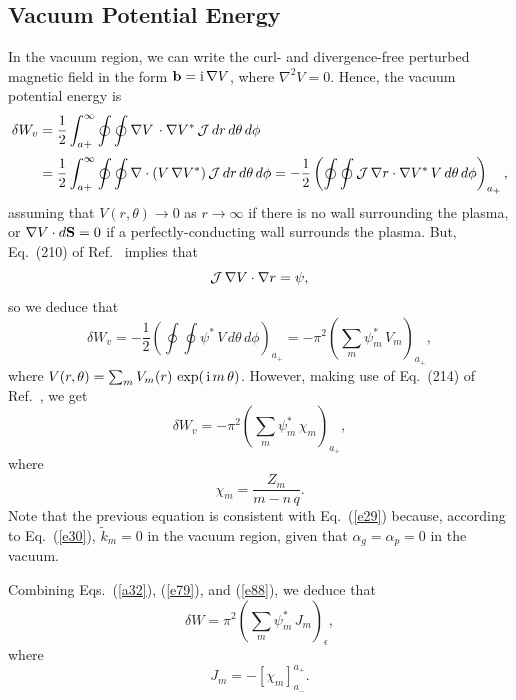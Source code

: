 \documentclass[12pt,prb,aps]{revtex4-1}
\begin{document}
\subsection{Vacuum Potential Energy}\label{vac}
In the vacuum region, we can write the curl- and divergence-free perturbed magnetic field in the form 
${\bf b} = {\rm i}\,\nabla V$,
where
$\nabla^2 V =0$.
Hence, the vacuum potential energy is
\begin{align}
\delta W_v &= \frac{1}{2}\int_{a+}^\infty\oint\oint\nabla V\,\cdot\nabla V^\ast\,{\cal J}\,dr\,d\theta\,d\phi\nonumber\\[0.5ex]
&= \frac{1}{2}\int_{a+}^\infty\oint\oint  \nabla\cdot(V\,\nabla V^\ast)\,{\cal J}\,dr\,d\theta\,d\phi=-\frac{1}{2}\left(\oint\oint {\cal J}\,\nabla r\cdot\nabla V^\ast\,V\,d\theta\,d\phi\right)_{a_+},
\end{align}
assuming that $V(r,\theta)\rightarrow 0$ as $r\rightarrow \infty$ if there is no wall surrounding the plasma, or  $\nabla V\cdot d{\bf S}=0$ if a perfectly-conducting wall
surrounds the plasma. 
But, Eq.~(210) of Ref.~ implies that 
\begin{equation}
{\cal J}\,\nabla V\cdot\nabla r = \psi,
\end{equation}
so we deduce that
\begin{equation}\label{e87}
\delta W_v = -\frac{1}{2}\left(\oint\oint \psi^\ast\,V\,d\theta\,d\phi\right)_{a_{+}} =- \pi^2\left(\sum_m \psi_m^\ast\,V_m\right)_{a_{+}},
\end{equation}
where
$V(r,\theta)= \sum_m V_m(r)\,\exp(\,{\rm i}\,m\,\theta)$. 
However, making use of Eq.~(214) of Ref.~, we get
\begin{equation}\label{e88}
\delta W_v =-\pi^2\left(\sum_m\psi_m^\ast\,\chi_m\right)_{a_+},
\end{equation}
where
\begin{equation}\label{e89}
\chi_m=\frac{Z_m}{m-n\,q}.
 \end{equation}
 Note that the previous equation is consistent with Eq.~(\ref{e29}) because, according to Eq.~(\ref{e30}),  $\tilde{k}_m=0$ in the vacuum region, given that $\alpha_g=\alpha_p=0$ in the vacuum. 

Combining Eqs.~(\ref{a32}), (\ref{e79}),  and (\ref{e88}), we deduce that
\begin{equation}\label{e89a}
\delta W = \pi^2\left(\sum_m\psi_m^\ast\,J_m\right)_\epsilon,
\end{equation}
where
\begin{equation}\label{e90}
J_m= -\left[\chi_m\right]_{a_-}^{a_+}.
\end{equation}
\end{document}
